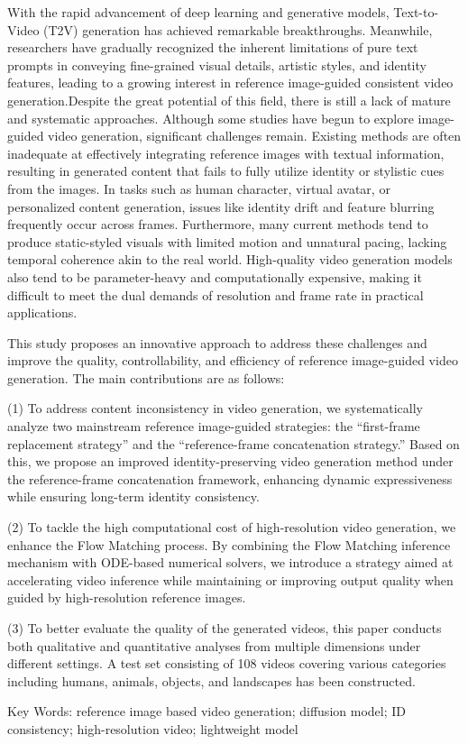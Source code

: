 With the rapid advancement of deep learning and generative models, Text-to-Video (T2V) generation has achieved remarkable breakthroughs. Meanwhile, researchers have gradually recognized the inherent limitations of pure text prompts in conveying fine-grained visual details, artistic styles, and identity features, leading to a growing interest in reference image-guided consistent video generation.Despite the great potential of this field, there is still a lack of mature and systematic approaches. Although some studies have begun to explore image-guided video generation, significant challenges remain. Existing methods are often inadequate at effectively integrating reference images with textual information, resulting in generated content that fails to fully utilize identity or stylistic cues from the images. In tasks such as human character, virtual avatar, or personalized content generation, issues like identity drift and feature blurring frequently occur across frames. Furthermore, many current methods tend to produce static-styled visuals with limited motion and unnatural pacing, lacking temporal coherence akin to the real world. High-quality video generation models also tend to be parameter-heavy and computationally expensive, making it difficult to meet the dual demands of resolution and frame rate in practical applications.

This study proposes an innovative approach to address these challenges and improve the quality, controllability, and efficiency of reference image-guided video generation. The main contributions are as follows:

(1) To address content inconsistency in video generation, we systematically analyze two mainstream reference image-guided strategies: the “first-frame replacement strategy” and the “reference-frame concatenation strategy.” Based on this, we propose an improved identity-preserving video generation method under the reference-frame concatenation framework, enhancing dynamic expressiveness while ensuring long-term identity consistency.

(2) To tackle the high computational cost of high-resolution video generation, we enhance the Flow Matching process. By combining the Flow Matching inference mechanism with ODE-based numerical solvers, we introduce a strategy aimed at accelerating video inference while maintaining or improving output quality when guided by high-resolution reference images.

(3) To better evaluate the quality of the generated videos, this paper conducts both qualitative and quantitative analyses from multiple dimensions under different settings. A test set consisting of 108 videos covering various categories including humans, animals, objects, and landscapes has been constructed.

\vspace{0.5cm} %

\noindent
Key Words: reference image based video generation; diffusion model; ID consistency; high-resolution video; lightweight model
